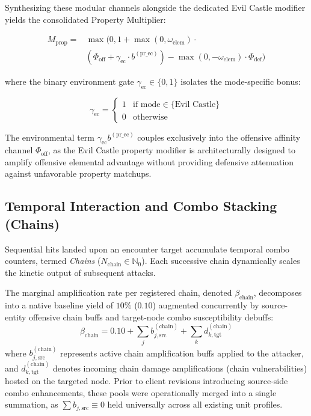 \documentclass[twocolumn,10pt]{article}
\begin{document}
Synthesizing these modular channels alongside the dedicated Evil Castle modifier yields the consolidated Property Multiplier:

\begin{equation}
\label{eq:prop_multiplier}
\begin{aligned}
  M_{\text{prop}} ={}& \max \Big(0, 1 + \max(0, \omega_{\text{elem}}) \cdot\\
  & \left(\Phi_{\text{off}} + \gamma_{\text{ec}} \cdot b^{(\text{pr\_ec})}\right) - \max(0, -\omega_{\text{elem}}) \cdot \Phi_{\text{def}}\Big)
\end{aligned}
\end{equation}

where the binary environment gate $\gamma_{\text{ec}} \in \{0, 1\}$ isolates the mode-specific bonus:

\begin{equation}
\label{eq:gamma_ec}
  \gamma_{\text{ec}} = 
  \begin{cases} 
    1 & \text{if mode} \in \{\text{Evil Castle}\} \\ 
    0 & \text{otherwise} 
  \end{cases}
\end{equation}

The environmental term $\gamma_{\text{ec}} b^{(\text{pr\_ec})}$ couples exclusively into the offensive affinity channel $\Phi_{\text{off}}$, as the Evil Castle property modifier is architecturally designed to amplify offensive elemental advantage without providing defensive attenuation against unfavorable property matchups.

\subsection{Temporal Interaction and Combo Stacking (Chains)}
\label{sec:chains}
Sequential hits landed upon an encounter target accumulate temporal combo counters, termed \textit{Chains} ($N_{\text{chain}} \in \mathbb{N}_0$). Each successive chain dynamically scales the kinetic output of subsequent attacks.

The marginal amplification rate per registered chain, denoted $\beta_{\text{chain}}$, decomposes into a native baseline yield of $10\%$ ($0.10$) augmented concurrently by source-entity offensive chain buffs and target-node combo susceptibility debuffs:
\begin{equation}
\label{eq:chain_rate}
\beta_{\text{chain}} = 0.10 + \sum_{j} b_{j,\text{src}}^{(\text{chain})} + \sum_{k} d_{k,\text{tgt}}^{(\text{chain})}
\end{equation}
where $b_{j,\text{src}}^{(\text{chain})}$ represents active chain amplification buffs applied to the attacker, and $d_{k,\text{tgt}}^{(\text{chain})}$ denotes incoming chain damage amplifications (chain vulnerabilities) hosted on the targeted node. Prior to client revisions introducing source-side combo enhancements, these pools were operationally merged into a single summation, as $\sum b_{j,\text{src}} \equiv 0$ held universally across all existing unit profiles.
\end{document}
